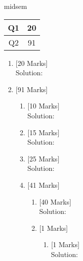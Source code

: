 \documentclass[10pt]{article}
\begin{document}
\vspace*{2cm}
\begin{center}
midsem
\\\vspace*{1cm}
\begin{tabular}{|c|c|}
\hline Q1 & 20 \\ \hline Q2 & 91 \\ \hline \end{tabular}\end{center}
\begin{enumerate}\item {}\hfill
[20 Marks]
\\Solution:\\ \vspace*{300pt}\item {}\hfill
[91 Marks]
\begin{enumerate}\item {}\hfill
[10 Marks]
\\Solution:\\ \vspace*{150pt}\item {}\hfill
[15 Marks]
\\Solution:\\ \vspace*{225pt}\item {}\hfill
[25 Marks]
\\Solution:\\ \vspace*{375pt}\item {}\hfill
[41 Marks]
\begin{enumerate}\item {}\hfill
[40 Marks]
\\Solution:\\ \vspace*{600pt}\item {}\hfill
[1 Marks]
\begin{enumerate}\item {}\hfill
[1 Marks]
\\Solution:\\ \vspace*{15pt}\end{enumerate}
\end{enumerate}
\end{enumerate}
\end{enumerate}
\end{document}
